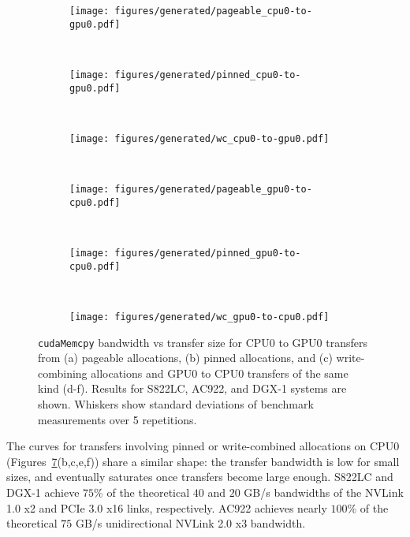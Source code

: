 \begin{figure}[H]
	\centering
	\begin{subfigure}[b]{0.3\textwidth}
		\texttt{[image: figures/generated/pageable\_cpu0-to-gpu0.pdf]}
		\caption{}
		\label{fig:pageable-cpu0-gpu0}
	\end{subfigure}
	~
	\begin{subfigure}[b]{0.3\textwidth}
		\texttt{[image: figures/generated/pinned\_cpu0-to-gpu0.pdf]}
		\caption{}
		\label{fig:pinned-cpu0-gpu0}
	\end{subfigure}
	~
	\begin{subfigure}[b]{0.3\textwidth}
		\texttt{[image: figures/generated/wc\_cpu0-to-gpu0.pdf]}
		\caption{}
		\label{fig:wc-cpu0-gpu0}
	\end{subfigure}
	\\
	\begin{subfigure}[b]{0.3\textwidth}
		\texttt{[image: figures/generated/pageable\_gpu0-to-cpu0.pdf]}
		\caption{}
		\label{fig:pageable-gpu0-cpu0}
	\end{subfigure}
	~
	\begin{subfigure}[b]{0.3\textwidth}
		\texttt{[image: figures/generated/pinned\_gpu0-to-cpu0.pdf]}
		\caption{}
		\label{fig:pinned-gpu0-cpu0}
	\end{subfigure}
	~
	\begin{subfigure}[b]{0.3\textwidth}
		\texttt{[image: figures/generated/wc\_gpu0-to-cpu0.pdf]}
		\caption{}
		\label{fig:wc-gpu0-cpu0}
	\end{subfigure}
	\caption[\texttt{cudaMemcpy} bandwidth for CPU0-GPU0 transfers.]{
		\texttt{cudaMemcpy} bandwidth vs transfer size for CPU0 to GPU0 transfers from 
		(a) pageable allocations,
		(b) pinned allocations, and
		(c) write-combining allocations and 
		GPU0 to CPU0 transfers of the same kind (d-f).
		Results for S822LC, AC922, and DGX-1 systems are shown.
		Whiskers show standard deviations of benchmark measurements over 5 repetitions.
	}
	\label{fig:pageable-pinned-wc}
\end{figure}


The curves for transfers involving pinned or write-combined allocations on CPU0 (Figures~\ref{fig:pageable-pinned-wc}(b,c,e,f)) share a similar shape: the transfer bandwidth is low for small sizes, and eventually saturates once transfers become large enough.
S822LC and DGX-1 achieve \mytilde $75$\% of the theoretical $40$ and $20$ GB/s bandwidths of the NVLink 1.0 x2 and PCIe 3.0 x16 links, respectively.
AC922 achieves nearly $100$\% of the theoretical $75$ GB/s unidirectional NVLink 2.0 x3 bandwidth.

